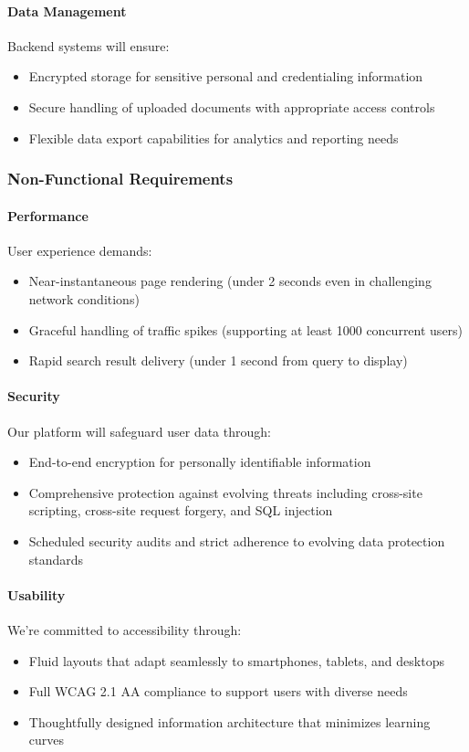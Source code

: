 \documentclass[12pt,a4paper]{article}
\begin{document}
\paragraph{Data Management}
Backend systems will ensure:
\begin{itemize}
    \item Encrypted storage for sensitive personal and credentialing information
    \item Secure handling of uploaded documents with appropriate access controls
    \item Flexible data export capabilities for analytics and reporting needs
\end{itemize}

\subsubsection{Non-Functional Requirements}

\paragraph{Performance}
User experience demands:
\begin{itemize}
    \item Near-instantaneous page rendering (under 2 seconds even in challenging network conditions)
    \item Graceful handling of traffic spikes (supporting at least 1000 concurrent users)
    \item Rapid search result delivery (under 1 second from query to display)
\end{itemize}

\paragraph{Security}
Our platform will safeguard user data through:
\begin{itemize}
    \item End-to-end encryption for personally identifiable information
    \item Comprehensive protection against evolving threats including cross-site scripting, cross-site request forgery, and SQL injection
    \item Scheduled security audits and strict adherence to evolving data protection standards
\end{itemize}

\paragraph{Usability}
We're committed to accessibility through:
\begin{itemize}
    \item Fluid layouts that adapt seamlessly to smartphones, tablets, and desktops
    \item Full WCAG 2.1 AA compliance to support users with diverse needs
    \item Thoughtfully designed information architecture that minimizes learning curves
\end{itemize}
\end{document}
